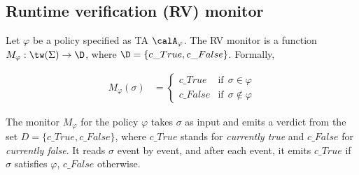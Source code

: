 \subsection{Runtime verification (RV) monitor}
\begin{definition}
	\label{def:rv:mon}
	Let $\varphi$ be a policy specified as TA $\calA_\varphi$. The RV monitor is a function $M_{\varphi}: \tw(\Sigma) \rightarrow \D$, where $\D= \{c\_True, c\_False\}$. Formally,
	\vspace{-0.5em}
	\[
	\begin{array}{lll}
		M_{\varphi}(\sigma) & =
		\begin{cases}
			c\_True & \mbox{if}\ \ \sigma\in\varphi \\%
			c\_False & \mbox{if}\ \ \sigma\not\in\varphi %
		\end{cases}
	\end{array}
	\]
\end{definition}
The monitor $M_{\varphi}$ for the policy $\varphi$ takes $\sigma$ as input and emits a verdict from the set $D = \{c\_True, c\_False\}$, where $c\_True$ stands for \emph{currently true} and $c\_False$ for \emph{currently false}. It reads $\sigma$ event by event, and after each event, it emits $c\_True$ if $\sigma$ satisfies $\varphi$, $c\_False$ otherwise.



